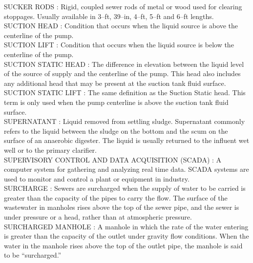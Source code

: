 SUCKER RODS :  Rigid, coupled sewer rods of metal or wood used for clearing stoppages. Usually available in 3–ft, 39–in, 4–ft, 5–ft and 6–ft lengths. \\
\vspace{0.15cm}
SUCTION HEAD :   Condition that occurs when the liquid source is above the centerline of the pump.\\
\vspace{0.15cm}
SUCTION LIFT :   Condition that occurs when the liquid source is below the centerline of the pump.\\
\vspace{0.15cm}
SUCTION STATIC HEAD :   The difference in elevation between the liquid level of the source of supply and the centerline of the pump. This head also includes any additional head that may be present at the suction tank fluid surface.\\
\vspace{0.15cm}
SUCTION STATIC LIFT :   The same definition as the Suction Static head. This term is only used when the pump centerline is above the suction tank fluid surface.\\
\vspace{0.15cm}
SUPERNATANT :  Liquid removed from settling sludge. Supernatant commonly refers to the liquid between the sludge on the bottom and the scum on the surface of an anaerobic digester. The liquid is usually returned to the influent wet well or to the primary clarifier.\\
\vspace{0.15cm}
SUPERVISORY CONTROL AND DATA ACQUISITION (SCADA) :   A computer system for gathering and analyzing real time data. SCADA systems are used to monitor and control a plant or equipment in industry.\\
\vspace{0.15cm}
SURCHARGE :  Sewers are surcharged when the supply of water to be carried is greater than the capacity of the pipes to carry the flow. The surface of the wastewater in manholes rises above the top of the sewer pipe, and the sewer is under pressure or a head, rather than at atmospheric pressure. \\
\vspace{0.15cm}
SURCHARGED MANHOLE :  A manhole in which the rate of the water entering is greater than the capacity of the outlet under gravity flow conditions. When the water in the manhole rises above the top of the outlet pipe, the manhole is said to be “surcharged.” \\
\vspace{0.15cm}
